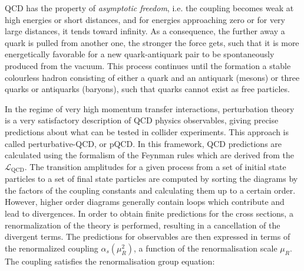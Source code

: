 QCD has the property of \textit{asymptotic freedom}, i.e. the coupling becomes weak at high energies or short distances, and for energies approaching zero or for very large distances, it tends toward infinity.
As a consequence, the further away a quark is pulled from another one, the stronger the force gets, such that it is more energetically favorable for a new quark-antiquark pair to be spontaneously produced from the vacuum.
This process continues until the formation a stable colourless hadron consisting of either a quark and an antiquark (mesons) or three quarks or antiquarks (baryons), such that quarks cannot exist as free particles.

In the regime of very high momentum transfer interactions, perturbation theory is a very satisfactory description of QCD physics observables, giving precise predictions about what can be tested in collider experiments. This approach is called perturbative-QCD, or pQCD. In this framework, QCD predictions are calculated using the formalism of the Feynman rules which are derived from the $\mathcal{L}_\mathrm{QCD}$.
The transition amplitudes for a given process from a set of initial state particles to a set of final state particles are computed by sorting the diagrams by the factors of the coupling constants and calculating them up to a certain order. However, higher order diagrams generally contain loops which contribute and lead to divergences.
In order to obtain finite predictions for the cross sections, a renormalization of the theory is performed, resulting in a cancellation of the divergent terms.
The predictions for observables are then expressed in terms of the renormalized coupling $\alpha_s(\mu^2_R)$, a function of the renormalisation scale $\mu_R$. 
The coupling satisfies the renormalisation group equation:

